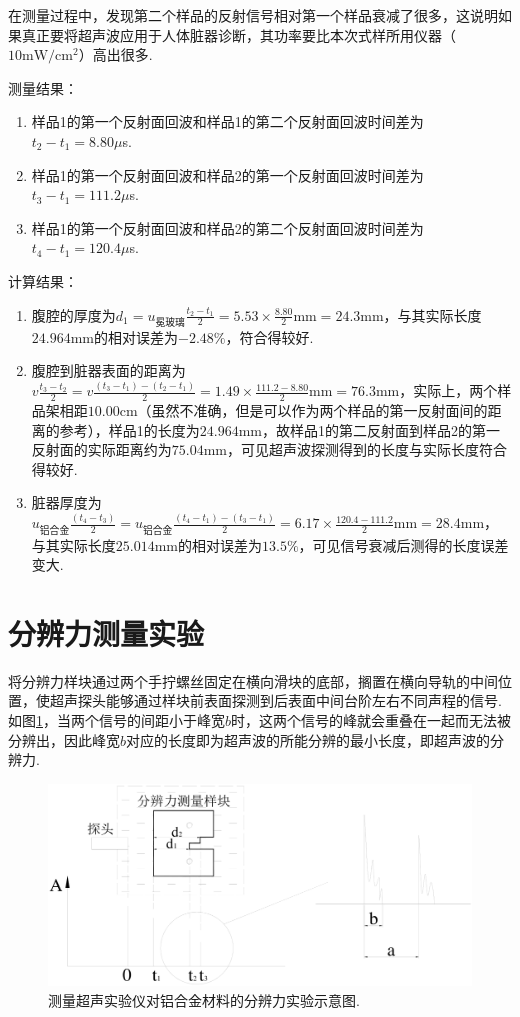 \documentclass[UTF8,10pt,a4paper]{article}
\begin{document}
在测量过程中，发现第二个样品的反射信号相对第一个样品衰减了很多，这说明如果真正要将超声波应用于人体脏器诊断，其功率要比本次式样所用仪器（$10\text{mW}/\text{cm}^2$）高出很多.

测量结果：
\begin{enumerate}
    \item 样品1的第一个反射面回波和样品1的第二个反射面回波时间差为$t_2-t_1=8.80\mu$s.
    \item 样品1的第一个反射面回波和样品2的第一个反射面回波时间差为$t_3-t_1=111.2\mu$s.
    \item 样品1的第一个反射面回波和样品2的第二个反射面回波时间差为$t_4-t_1=120.4\mu$s.
\end{enumerate}

计算结果：
\begin{enumerate}
    \item 腹腔的厚度为$d_1=u_{\text{冕玻璃}}\frac{t_2-t_1}{2}=5.53\times\frac{8.80}{2}\text{mm}=24.3$mm，与其实际长度$24.964$mm的相对误差为$-2.48\%$，符合得较好.
    \item 腹腔到脏器表面的距离为$v\frac{t_3-t_2}{2}=v\frac{(t_3-t_1)-(t_2-t_1)}{2}=1.49\times\frac{111.2-8.80}{2}\text{mm}=76.3$mm，实际上，两个样品架相距$10.00$cm（虽然不准确，但是可以作为两个样品的第一反射面间的距离的参考），样品1的长度为$24.964$mm，故样品1的第二反射面到样品2的第一反射面的实际距离约为$75.04$mm，可见超声波探测得到的长度与实际长度符合得较好.
    \item 脏器厚度为$u_{\text{铝合金}}\frac{(t_4-t_3)}{2}=u_{\text{铝合金}}\frac{(t_4-t_1)-(t_3-t_1)}{2}=6.17\times\frac{120.4-111.2}{2}\text{mm}=28.4$mm，与其实际长度$25.014$mm的相对误差为$13.5\%$，可见信号衰减后测得的长度误差变大.
\end{enumerate}

\section{分辨力测量实验}
将分辨力样块通过两个手拧螺丝固定在横向滑块的底部，搁置在横向导轨的中间位置，使超声探头能够通过样块前表面探测到后表面中间台阶左右不同声程的信号. 如图\ref{5}，当两个信号的间距小于峰宽$b$时，这两个信号的峰就会重叠在一起而无法被分辨出，因此峰宽$b$对应的长度即为超声波的所能分辨的最小长度，即超声波的分辨力.

\begin{figure}[h]
    \centering
    \includegraphics[width=.6\textwidth]{5.png}
    \caption{测量超声实验仪对铝合金材料的分辨力实验示意图.}
    \label{5}
\end{figure}
\end{document}
